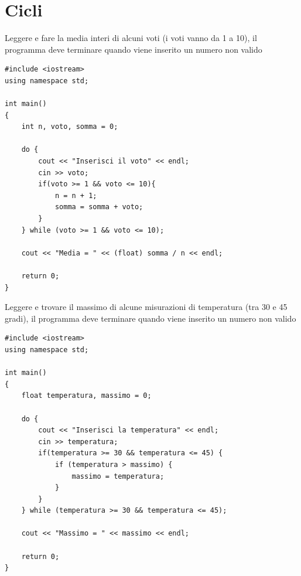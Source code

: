 \documentclass[11pt,fleqn]{book}
\begin{document}
\newpage

\section{Cicli}

\begin{esercizio}[1]
    Leggere e fare la media interi di alcuni voti (i voti vanno da 1 a 10), il programma deve terminare quando viene inserito un numero non valido
    \ifsoluzioni
    \solution
    \begin{lstlisting}[style=cpp]
#include <iostream>
using namespace std;

int main() 
{
    int n, voto, somma = 0;

    do {
        cout << "Inserisci il voto" << endl;    
        cin >> voto;
        if(voto >= 1 && voto <= 10){
            n = n + 1;
            somma = somma + voto;
        }
    } while (voto >= 1 && voto <= 10);

    cout << "Media = " << (float) somma / n << endl;

    return 0;
}
    \end{lstlisting}
    \fi
\end{esercizio}


\begin{esercizio}[1]
    Leggere e trovare il massimo di alcune misurazioni di temperatura (tra 30 e 45 gradi), il programma deve terminare quando viene inserito un numero non valido
    \ifsoluzioni
    \solution
    \begin{lstlisting}[style=cpp]
#include <iostream>
using namespace std;

int main() 
{
    float temperatura, massimo = 0;

    do {
        cout << "Inserisci la temperatura" << endl;    
        cin >> temperatura;
        if(temperatura >= 30 && temperatura <= 45) {
            if (temperatura > massimo) {
                massimo = temperatura;
            }
        }
    } while (temperatura >= 30 && temperatura <= 45);

    cout << "Massimo = " << massimo << endl;

    return 0;
}
    \end{lstlisting}
    \fi
\end{esercizio}
\end{document}

